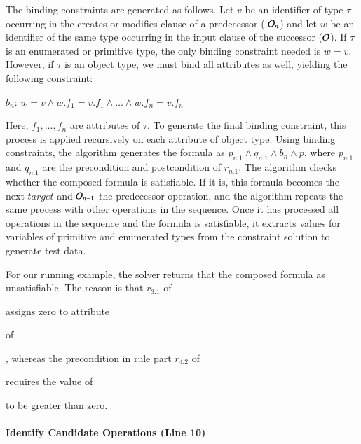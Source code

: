 The binding constraints are generated as follows. Let $v$ be an identifier of
type $\tau$ occurring in the creates or modifies clause of a predecessor (\eg
${\cal O}_n$) and let $w$ be an identifier of the same type occurring in the
input clause of the successor (\eg ${\cal O}$). If $\tau$ is an enumerated or
primitive type, the only binding constraint needed is $w = v$. However, if
$\tau$ is an object type, we must bind all attributes as well, yielding the
following constraint:

$b_n$: $w = v \wedge w.f_1 = v.f_1 \wedge \ldots \wedge w.f_n = v.f_n$ 

Here, $f_1, \ldots , f_n$ are attributes of $\tau$. To generate the final
binding constraint, this process is applied recursively on each attribute of
object type. Using binding constraints, the algorithm generates the formula as
$p_{n.1} \wedge q_{n.1} \wedge b_n \wedge p$, where $p_{n.1}$ and $q_{n.1}$ are
the precondition and postcondition of $r_{n.1}$. The algorithm checks whether
the composed formula is satisfiable.  If it is, this formula becomes the next
$target$ and ${\cal O}_{n-1}$ the predecessor operation, and the algorithm
repeats the same process with other operations in the sequence.  Once it has
processed all operations in the sequence and the formula is satisfiable, it
extracts values for variables of primitive and enumerated types from the
constraint solution to generate test data.

For our running example, the solver returns that the composed formula as
unsatisfiable. The reason is that $r_{3.1}$ of \subject{CreateOrder} assigns
zero to attribute \subject{total} of \subject{Order}, whereas the precondition
in rule part $r_{4.2}$ of \subject{GenerateInvoice} requires the value of
\subject{total} to be greater than zero.



\vskip -7pt
\paragraph*{Identify Candidate Operations (Line 10)}

